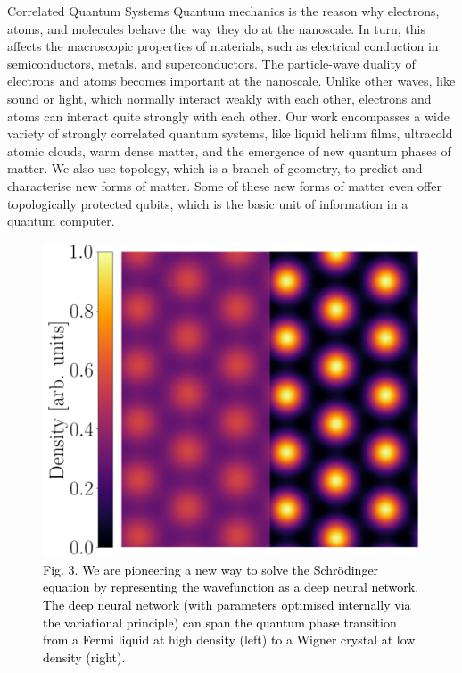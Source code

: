 \documentclass[xcolor={table}]{beamer}
\begin{document}
\begin{frame}[fragile=singleslide,t]
\begin{columns}[onlytextwidth,T]
\begin{column}{.47\textwidth}
\begin{block}{Correlated Quantum Systems}
Quantum mechanics is the reason why electrons, atoms, and molecules behave the way they do at the nanoscale. In turn, this affects the macroscopic properties of materials, such as electrical conduction in semiconductors, metals, and superconductors. The particle-wave duality of electrons and atoms becomes important at the nanoscale. Unlike other waves, like sound or light, which normally interact weakly with each other, electrons and atoms can interact quite strongly with each other. Our work encompasses a wide variety of strongly correlated quantum systems, like liquid helium films, ultracold atomic clouds, warm dense matter, and the emergence of new quantum phases of matter. We also use topology, which is a branch of geometry, to predict and characterise new forms of matter. Some of these new forms of matter even offer topologically protected qubits, which is the basic unit of information in a quantum computer.
\end{block}
\vspace*{-1.5cm}
\begin{figure}
\centering
    \includegraphics[width=0.52\columnwidth]{crystallisation.png}
    \caption{\footnotesize \textcolor{black}{Fig. 3. We are pioneering a new way to solve the Schr{\"o}dinger equation by representing the wavefunction as a deep neural network. The deep neural network (with parameters optimised internally via the variational principle) can span the quantum phase transition from a Fermi liquid at high density (left) to a Wigner crystal at low density (right).}}
\end{figure}


\end{column}
\end{columns}
\end{frame}
\end{document}
